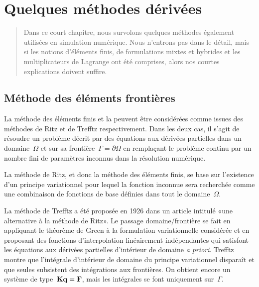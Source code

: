 \chapter{Quelques méthodes dérivées}\label{Ch-XFEM}
\begin{abstract}
Dans ce court chapitre, nous survolons quelques méthodes également utilisées en simulation numérique. Nous n'entrons pas dans le détail, mais si les notions d'éléments finis, de formulations mixtes et hybrides et les multiplicateurs de Lagrange ont été comprises, alors nos courtes explications doivent suffire.
\end{abstract}

\medskip
\section{Méthode des éléments frontières}\label{Sec-BEM}

La méthode des éléments finis et la  peuvent être considérées comme issues des méthodes de Ritz et de Trefftz respectivement. Dans les deux cas, il s'agit de résoudre un problème décrit par des équations aux dérivées partielles dans un domaine~$\Omega$ et sur sa frontière~$\Gamma=\partial\Omega$ en remplaçant le problème continu par un nombre fini de paramètres inconnus dans la résolution numérique.

\medskip
La méthode de Ritz, et donc la méthode des éléments finis, se base sur l'existence d'un principe variationnel pour lequel la fonction inconnue sera recherchée comme une combinaison de fonctions de base définies dans tout le domaine~$\Omega$.

\medskip
La méthode de Trefftz a été proposée en 1926 dans un article intitulé «une alternative à la méthode de Ritz». Le passage domaine/frontière se fait en appliquant le théorème de Green à la formulation variationnelle considérée et en proposant des fonctions d'interpolation linéairement indépendantes qui satisfont les équations aux dérivées partielles d'intérieur de domaine \emph{a priori}. Trefftz montre que l'intégrale d'intérieur de domaine du principe variationnel disparaît et que seules subsistent des intégrations aux frontières.  On obtient encore un système de type~$\MM{K}\VV{q}=\VV{F}$, mais les intégrales se font uniquement sur~$\Gamma$.

